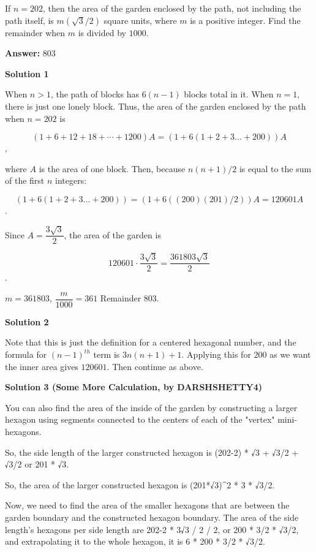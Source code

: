 \begin{enumerate}
 If $n=202$, then the area of the garden enclosed by the path, not including the path itself, is $m\left(\sqrt3/2\right)$ square units, where $m$ is a positive integer. Find the remainder when $m$ is divided by $1000$.


 
 \textbf{Answer: }803



\textbf{Solution 1}

When $n>1$, the path of blocks has $6(n-1)$ blocks total in it. When $n=1$, there is just one lonely block. Thus, the area of the garden enclosed by the path when $n=202$ is

 
 \[(1+6+12+18+\cdots +1200)A=(1+6(1+2+3...+200))A\],

 where $A$ is the area of one block. Then, because $n(n+1)/2$ is equal to the sum of the first $n$ integers:

 
 \[(1+6(1+2+3...+200))=(1+6((200)(201)/2))A=120601A\].

 Since $A=\dfrac{3\sqrt{3}}{2}$, the area of the garden is

 
 \[120601\cdot \dfrac{3\sqrt{3}}{2}=\dfrac{361803\sqrt{3}}{2}\].

 $m=361803$, $\dfrac{m}{1000}=361$ Remainder $\boxed{803}$.

 



\textbf{Solution 2}

Note that this is just the definition for a centered hexagonal number, and  the formula for $(n-1)^{th}$ term is $3n(n+1)+1$. Applying this for $200$ as we want the inner area gives $120601$. Then continue as above.

 



\textbf{Solution 3 (Some More Calculation, by DARSHSHETTY4)}

You can also find the area of the inside of the garden by constructing a larger hexagon using segments connected to the centers of each of the "vertex" mini-hexagons. 

 So, the side length of the larger constructed hexagon is (202-2) * √3 + √3/2 + √3/2 or 201 * √3. 

 So, the area of the larger constructed hexagon is (201*√3)\textasciicircum{}2 * 3 * √3/2. 

 Now, we need to find the area of the smaller hexagons that are between the garden boundary and the constructed hexagon boundary. The area of the side length's hexagons per side length are 202-2 * 3√3 / 2 / 2, or 200 * 3/2 * √3/2, and extrapolating it to the whole hexagon, it is 6 * 200 * 3/2 * √3/2. 


\end{enumerate}
